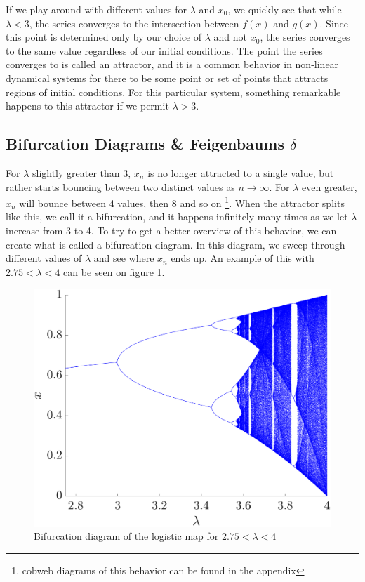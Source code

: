\documentclass[12pt,oneside,a4paper]{article}
\numberwithin{equation}{section}
\begin{document}
{{{{If we play around with different values for $\lambda$ and 
$x_0$, we quickly see that while $\lambda<3$, the series converges to the 
intersection between $f(x)$ and $g(x)$. Since this point is determined only by our choice of $\lambda$ 
and not $x_0$, the series converges to the same value regardless of our initial conditions. The point
the series converges to is called an attractor, and it is a common behavior in non-linear dynamical
systems for there to be some point or set of points that attracts regions of initial conditions. For this particular system, something remarkable happens to this attractor if we permit $\lambda>3$.

\subsection{Bifurcation Diagrams \& Feigenbaums $\delta$}
For $\lambda$ slightly greater than 3, $x_n$ is no longer attracted to a single value, but rather starts bouncing between two distinct values as $n \rightarrow \infty$. For $\lambda$ even greater, $x_n$ will bounce between 4 values, then 8 and so on \footnote{cobweb diagrams of this behavior can be found in the appendix}. When the attractor splits like this, we call it a bifurcation, and it happens infinitely many times as we let $\lambda$ increase from 3 to 4. To try to get a better overview of this behavior, we can create what is called a bifurcation diagram. In this diagram, we sweep through different values of $\lambda$ and see where $x_n$ ends up. An example of this with $2.75<\lambda<4$ can be seen on figure \ref{bifurcation}.
\begin{figure}
	\centering
	\includegraphics[width=0.65\linewidth]{Figures/Bifurcation}
	\caption{Bifurcation diagram of the logistic map for $2.75<\lambda<4$}
	\label{bifurcation}
\end{figure}
}}}}
\end{document}
